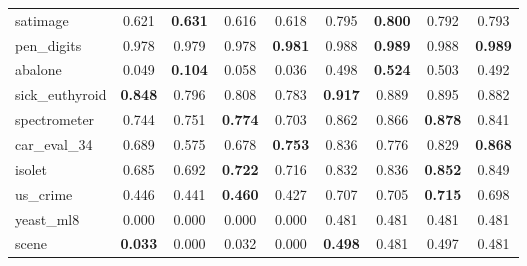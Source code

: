 \begin{figure}[ht]
\begin{tabular}{p{22mm}|*4{p{14mm}}|*4{p{14mm}}}
        satimage&\multicolumn{1}{c}{0.621}&\multicolumn{1}{c}{\textbf{0.631}}&\multicolumn{1}{c}{0.616}&\multicolumn{1}{c|}{0.618}&\multicolumn{1}{c}{0.795}&\multicolumn{1}{c}{\textbf{0.800}}&\multicolumn{1}{c}{0.792}&\multicolumn{1}{c}{0.793}\\
        pen\_digits&\multicolumn{1}{c}{0.978}&\multicolumn{1}{c}{0.979}&\multicolumn{1}{c}{0.978}&\multicolumn{1}{c|}{\textbf{0.981}}&\multicolumn{1}{c}{0.988}&\multicolumn{1}{c}{\textbf{0.989}}&\multicolumn{1}{c}{0.988}&\multicolumn{1}{c}{\textbf{0.989}}\\
        abalone&\multicolumn{1}{c}{0.049}&\multicolumn{1}{c}{\textbf{0.104}}&\multicolumn{1}{c}{0.058}&\multicolumn{1}{c|}{0.036}&\multicolumn{1}{c}{0.498}&\multicolumn{1}{c}{\textbf{0.524}}&\multicolumn{1}{c}{0.503}&\multicolumn{1}{c}{0.492}\\
        sick\_euthyroid&\multicolumn{1}{c}{\textbf{0.848}}&\multicolumn{1}{c}{0.796}&\multicolumn{1}{c}{0.808}&\multicolumn{1}{c|}{0.783}&\multicolumn{1}{c}{\textbf{0.917}}&\multicolumn{1}{c}{0.889}&\multicolumn{1}{c}{0.895}&\multicolumn{1}{c}{0.882}\\
        spectrometer&\multicolumn{1}{c}{0.744}&\multicolumn{1}{c}{0.751}&\multicolumn{1}{c}{\textbf{0.774}}&\multicolumn{1}{c|}{0.703}&\multicolumn{1}{c}{0.862}&\multicolumn{1}{c}{0.866}&\multicolumn{1}{c}{\textbf{0.878}}&\multicolumn{1}{c}{0.841}\\
        car\_eval\_34&\multicolumn{1}{c}{0.689}&\multicolumn{1}{c}{0.575}&\multicolumn{1}{c}{0.678}&\multicolumn{1}{c|}{\textbf{0.753}}&\multicolumn{1}{c}{0.836}&\multicolumn{1}{c}{0.776}&\multicolumn{1}{c}{0.829}&\multicolumn{1}{c}{\textbf{0.868}}\\
        isolet&\multicolumn{1}{c}{0.685}&\multicolumn{1}{c}{0.692}&\multicolumn{1}{c}{\textbf{0.722}}&\multicolumn{1}{c|}{0.716}&\multicolumn{1}{c}{0.832}&\multicolumn{1}{c}{0.836}&\multicolumn{1}{c}{\textbf{0.852}}&\multicolumn{1}{c}{0.849}\\
        us\_crime&\multicolumn{1}{c}{0.446}&\multicolumn{1}{c}{0.441}&\multicolumn{1}{c}{\textbf{0.460}}&\multicolumn{1}{c|}{0.427}&\multicolumn{1}{c}{0.707}&\multicolumn{1}{c}{0.705}&\multicolumn{1}{c}{\textbf{0.715}}&\multicolumn{1}{c}{0.698}\\
        yeast\_ml8&\multicolumn{1}{c}{0.000}&\multicolumn{1}{c}{0.000}&\multicolumn{1}{c}{0.000}&\multicolumn{1}{c|}{0.000}&\multicolumn{1}{c}{0.481}&\multicolumn{1}{c}{0.481}&\multicolumn{1}{c}{0.481}&\multicolumn{1}{c}{0.481}\\
        scene&\multicolumn{1}{c}{\textbf{0.033}}&\multicolumn{1}{c}{0.000}&\multicolumn{1}{c}{0.032}&\multicolumn{1}{c|}{0.000}&\multicolumn{1}{c}{\textbf{0.498}}&\multicolumn{1}{c}{0.481}&\multicolumn{1}{c}{0.497}&\multicolumn{1}{c}{0.481}\\

\end{tabular}
\end{figure}
